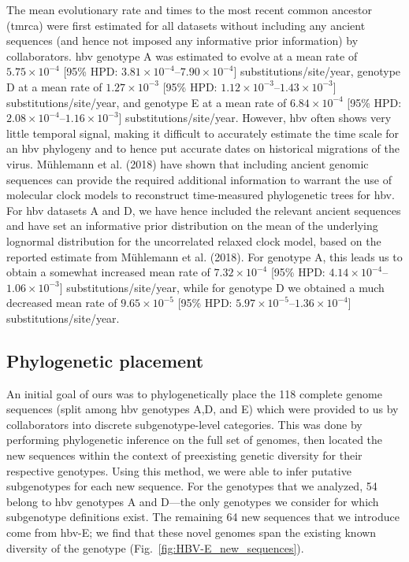 The mean evolutionary rate and times to the most recent common ancestor (\gls{tmrca}) were first estimated for all datasets without including any ancient sequences (and hence not imposed any informative prior information) by collaborators.
\gls{hbv} genotype A was estimated to evolve at a mean rate of $5.75\times10^{-4}$ [95\% HPD: $3.81\times10^{-4}$--$7.90\times10^{-4}$] substitutions/site/year, genotype D at a mean rate of $1.27\times10^{-3}$ [95\% HPD: $1.12\times10^{-3}$--$1.43\times10^{-3}$] substitutions/site/year, and genotype E at a mean rate of $6.84\times10^{-4}$ [95\% HPD: $2.08\times10^{-4}$--$1.16\times10^{-3}$] substitutions/site/year.
However, \gls{hbv} often shows very little temporal signal, making it difficult to accurately estimate the time scale for an \gls{hbv} phylogeny and to hence put accurate dates on historical migrations of the virus.
M{\"u}hlemann et al. (2018) have shown that including ancient genomic sequences can provide the required additional information to warrant the use of molecular clock models to reconstruct time-measured phylogenetic trees for \gls{hbv}.
For \gls{hbv} datasets A and D, we have hence included the relevant ancient sequences and have set an informative prior distribution on the mean of the underlying lognormal distribution for the uncorrelated relaxed clock model, based on the reported estimate from M{\"u}hlemann et al. (2018).
For genotype A, this leads us to obtain a somewhat increased mean rate of $7.32\times10^{-4}$ [95\% HPD: $4.14\times10^{-4}$--$1.06\times10^{-3}$] substitutions/site/year, while for genotype D we obtained a much decreased mean rate of $9.65\times10^{-5}$ [95\% HPD: $5.97\times10^{-5}$--$1.36\times10^{-4}$] substitutions/site/year.

\subsection{Phylogenetic placement}

An initial goal of ours was to phylogenetically place the 118 complete genome sequences (split among \gls{hbv} genotypes A,D, and E) which were provided to us by collaborators into discrete subgenotype-level categories.
This was done by performing phylogenetic inference on the full set of genomes, then located the new sequences within the context of preexisting genetic diversity for their respective genotypes.
Using this method, we were able to infer putative subgenotypes for each new sequence.
For the genotypes that we analyzed, 54 belong to \gls{hbv} genotypes A and D---the only genotypes we consider for which subgenotype definitions exist.
The remaining 64 new sequences that we introduce come from \gls{hbv}-E; we find that these novel genomes span the existing known diversity of the genotype (Fig.~\ref{fig:HBV-E_new_sequences}).

